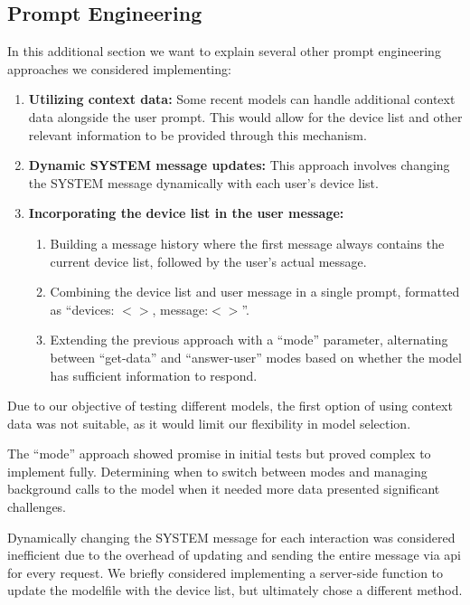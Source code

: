 \subsection{Prompt Engineering}
\label{sec:prompteng-appendix}
In this additional section we want to explain several other prompt engineering approaches we considered implementing:

\begin{enumerate}
    \item \textbf{Utilizing context data:} Some recent models can handle additional context data alongside the user prompt. This would allow for the device list and other relevant information to be provided through this mechanism.

    \item \textbf{Dynamic SYSTEM message updates:} This approach involves changing the SYSTEM message dynamically with each user's device list.

    \item \textbf{Incorporating the device list in the user message:}
    \begin{enumerate}
        \item Building a message history where the first message always contains the current device list, followed by the user's actual message.
        \item Combining the device list and user message in a single prompt, formatted as ``devices: $<>$, message:$<>$''.
        \item Extending the previous approach with a ``mode'' parameter, alternating between ``get-data'' and ``answer-user'' modes based on whether the model has sufficient information to respond.
    \end{enumerate}
\end{enumerate}

Due to our objective of testing different models, the first option of using context data was not suitable, as it would limit our flexibility in model selection.

The ``mode'' approach showed promise in initial tests but proved complex to implement fully. Determining when to switch between modes and managing background calls to the model when it needed more data presented significant challenges.

Dynamically changing the SYSTEM message for each interaction was considered inefficient due to the overhead of updating and sending the entire message via \gls{api} for every request. We briefly considered implementing a server-side function to update the modelfile with the device list, but ultimately chose a different method.

